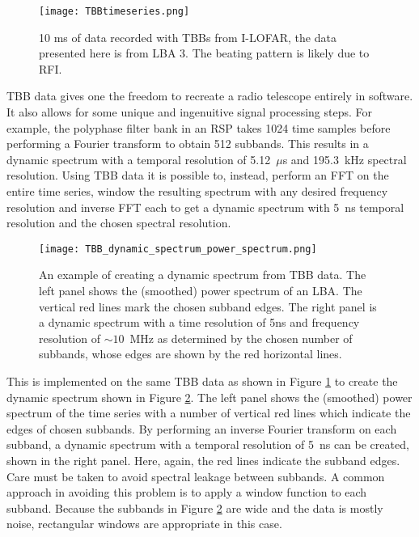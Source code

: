%
\begin{figure}[ht]
\centering
\texttt{[image: TBBtimeseries.png]}
\caption[10 ms of data recorded with TBBs from I-LOFAR.]{10 ms of data recorded with TBBs from I-LOFAR, the data presented here is from LBA 3. The beating pattern is likely due to RFI.}
\label{fig:TBB_timeseries}
\end{figure}

TBB data gives one the freedom to recreate a radio telescope entirely in software. It also allows for some unique and ingenuitive signal processing steps. For example, the polyphase filter bank in an RSP takes 1024 time samples before performing a Fourier transform to obtain 512 subbands. This results in a dynamic spectrum with a temporal resolution of 5.12~$\mu$s and 195.3~kHz spectral resolution. Using TBB data it is possible to, instead, perform an FFT on the entire time series, window the resulting spectrum with any desired frequency resolution and inverse FFT each to get a dynamic spectrum with 5~ns temporal resolution and the chosen spectral resolution. 

\begin{figure}[ht]
\centering
\texttt{[image: TBB\_dynamic\_spectrum\_power\_spectrum.png]}
\caption[A dynamic spectrum generated with TBB data from I-LOFAR.]{An example of creating a dynamic spectrum from TBB data. The left panel shows the (smoothed) power spectrum of an LBA. The vertical red lines mark the chosen subband edges. The right panel is a dynamic spectrum with a time resolution of 5ns and frequency resolution of $\sim 10$~MHz as determined by the chosen number of subbands, whose edges are shown by the red horizontal lines.}
\label{fig:TBB_dynamicspectrum}
\end{figure}

This is implemented on the same TBB data as shown in Figure \ref{fig:TBB_timeseries} to create the dynamic spectrum shown in Figure \ref{fig:TBB_dynamicspectrum}. The left panel shows the (smoothed) power spectrum of the time series with a number of vertical red lines which indicate the edges of chosen subbands. By performing an inverse Fourier transform on each subband, a dynamic spectrum with a temporal resolution of 5~ns can be created, shown in the right panel. Here, again, the red lines indicate the subband edges. Care must be taken to avoid spectral leakage between subbands. A common approach in avoiding this problem is to apply a window function to each subband. Because the subbands in Figure \ref{fig:TBB_dynamicspectrum} are wide and the data is mostly noise, rectangular windows are appropriate in this case.
 
